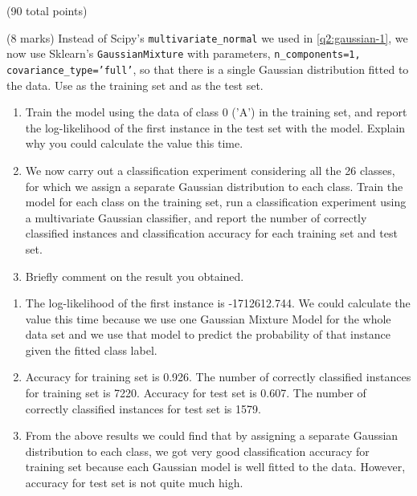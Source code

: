 \documentclass[12pt]{article}
\begin{document}
\begin{question}{(90 total points) \qTwoTitle}
\begin{subquestion}
  

\end{subquestion}

\begin{subquestion}{(8 marks)
    Instead of Scipy's {\tt multivariate\_normal} we used in \ref{q2:gaussian-1}, we now use Sklearn's {\tt GaussianMixture} with parameters, {\tt n\_components=1, covariance\_type='full'},
    so that there is a single Gaussian distribution fitted to the data.
    Use  as the training set and  as the test set.
  } \label{q2:gaussian-2}
  \begin{enumerate}\NARROWITEM
  \item Train the model using the data of class 0 ('A') in the training set, and report  the log-likelihood of the first instance in the test set with the model. Explain why you could calculate the value this time.
  \item We now carry out a classification experiment considering all the 26 classes, for which we assign a separate Gaussian distribution to each class.
    Train the model for each class on the training set, run a classification experiment using a multivariate Gaussian classifier, and report the number of correctly classified instances and classification accuracy for each training set and test set. 
  \item Briefly comment on the result you obtained.
  \end{enumerate}
   

  \begin{answerbox}{0.6\textheight}
    \begin{enumerate}
    \item The log-likelihood of the first instance is -1712612.744. We could calculate the value this time because we use one Gaussian Mixture Model for the whole data set and we use that model to predict the probability of that instance given the fitted class label.
    \item Accuracy for training set is 0.926. The number of correctly classified instances for training set is 7220. Accuracy for test set is 0.607. The number of correctly classified instances for test set is 1579.
    \item From the above results we could find that by assigning a separate Gaussian distribution to each class, we got very good classification accuracy for training set because each Gaussian model is well fitted to the data. However, accuracy for test set is not quite much high.
    \end{enumerate}
  \end{answerbox}
  



\end{subquestion}
\end{question}
\end{document}
